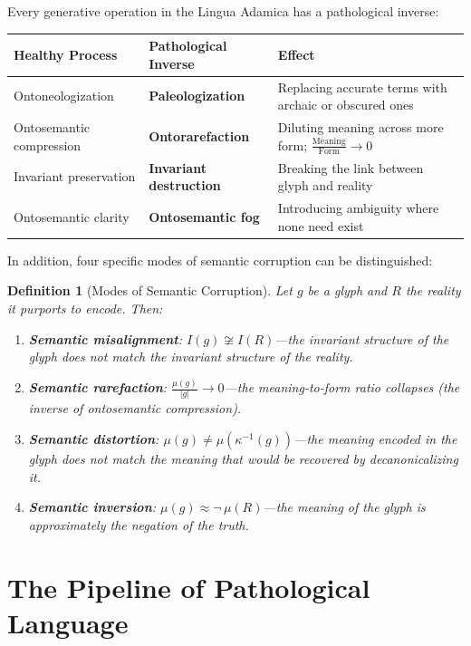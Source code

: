 \documentclass[12pt, letterpaper]{book}
\def\mathfrak#1{#1}%
\newtheorem{definition}{Definition}[chapter]
\begin{document}
Every generative operation in the Lingua Adamica has a pathological inverse:

\begin{center}
\small
\begin{tabular}{llp{6.5cm}}
\toprule
\textbf{Healthy Process} & \textbf{Pathological Inverse} & \textbf{Effect} \\
\midrule
Ontoneologization & \textbf{Paleologization} & Replacing accurate terms with archaic or obscured ones \\
Ontosemantic compression & \textbf{Ontorarefaction} & Diluting meaning across more form; $\frac{\text{Meaning}}{\text{Form}} \to 0$ \\
Invariant preservation & \textbf{Invariant destruction} & Breaking the link between glyph and reality \\
Ontosemantic clarity & \textbf{Ontosemantic fog} & Introducing ambiguity where none need exist \\
\bottomrule
\end{tabular}
\end{center}

In addition, four specific modes of semantic corruption can be distinguished:

\begin{definition}[Modes of Semantic Corruption]\label{def:corruption}
Let $\mathfrak{g}$ be a glyph and $R$ the reality it purports to encode. Then:
\begin{enumerate}[label=(\roman*)]
    \item \textbf{Semantic misalignment}: $I(\mathfrak{g}) \not\cong I(R)$---the invariant structure of the glyph does not match the invariant structure of the reality.
    \item \textbf{Semantic rarefaction}: $\frac{\mu(\mathfrak{g})}{|\mathfrak{g}|} \to 0$---the meaning-to-form ratio collapses (the inverse of ontosemantic compression).
    \item \textbf{Semantic distortion}: $\mu(\mathfrak{g}) \neq \mu(\kappa^{-1}(\mathfrak{g}))$---the meaning encoded in the glyph does not match the meaning that would be recovered by decanonicalizing it.
    \item \textbf{Semantic inversion}: $\mu(\mathfrak{g}) \approx \neg\, \mu(R)$---the meaning of the glyph is approximately the negation of the truth.
\end{enumerate}
\end{definition}

\section{The Pipeline of Pathological Language}
\end{document}
